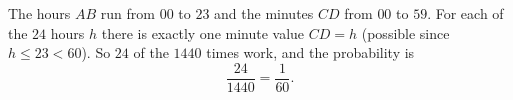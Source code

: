 The hours $AB$ run from $00$ to $23$ and the minutes $CD$ from $00$ to $59$. For each of the $24$ hours $h$ there is exactly one minute value $CD=h$ (possible since $h\le23<60$). So $24$ of the $1440$ times work, and the probability is
\[\dfrac{24}{1440}=\boxed{\dfrac{1}{60}}.\]
